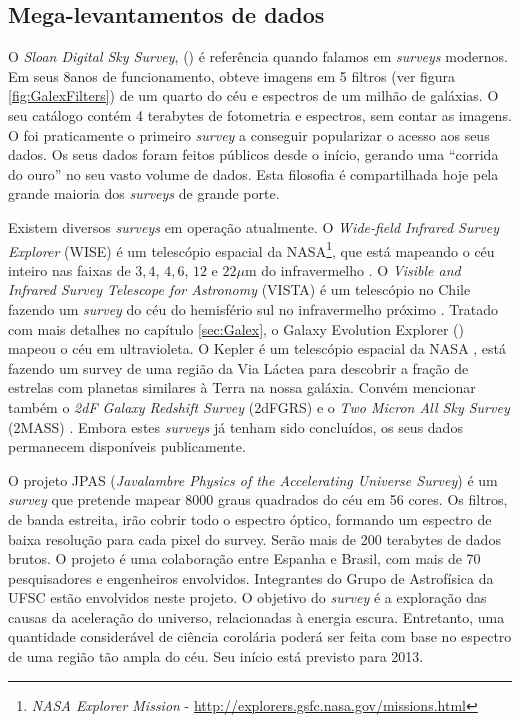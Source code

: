 \subsection{Mega-levantamentos de dados}

O {\em Sloan Digital Sky Survey}, (\SDSS) \citep{York2000} é referência quando
falamos em {\em surveys} modernos. Em seus 8\fixme anos de funcionamento, obteve
imagens em 5 filtros (ver figura \ref{fig:GalexFilters}) de um quarto do céu e
espectros de um milhão de galáxias. O seu catálogo contém 4 terabytes de
fotometria e espectros, sem contar as imagens. O \SDSS foi praticamente o
primeiro {\em survey} a conseguir popularizar o acesso aos seus dados. Os seus
dados foram feitos públicos desde o início\citneed, gerando uma ``corrida do
ouro'' no seu vasto volume de dados. Esta filosofia é compartilhada hoje pela
grande maioria dos {\em surveys} de grande porte.

Existem diversos {\em surveys} em operação atualmente. O {\em Wide-field
Infrared Survey Explorer} (WISE) é um telescópio espacial da NASA\footnote{{\em
NASA Explorer Mission} - \url{http://explorers.gsfc.nasa.gov/missions.html}},
que está mapeando o céu inteiro nas faixas de $3,4$, $4,6$, $12$ e $22\mu$m do
infravermelho \citep{Wright2010}. O {\em Visible and Infrared Survey Telescope
for Astronomy} (VISTA) é um telescópio no Chile fazendo um {\em survey} do céu
do hemisfério sul no infravermelho próximo \citep{Born2010}. Tratado com mais
detalhes no capítulo \ref{sec:Galex}, o {Galaxy Evolution Explorer} (\galex)
mapeou o céu em ultravioleta. O Kepler é um telescópio espacial da NASA
\citep{Borucki2010}, está fazendo um survey de uma região da Via Láctea para
descobrir a fração de estrelas com planetas similares à Terra na nossa galáxia.
Convém mencionar também o {\em 2dF Galaxy Redshift Survey} (2dFGRS)
\citep{Colless1999} e o {\em Two Micron All Sky Survey} (2MASS)
\citep{Skrutskie2006}. Embora estes {\em surveys} já tenham sido concluídos, os
seus dados permanecem disponíveis publicamente.

O projeto JPAS ({\em Javalambre Physics of the Accelerating Universe Survey}) é
um {\em survey} que pretende mapear $8000$ graus quadrados do céu em 56
cores\citep{Benitez2009}. Os filtros, de banda estreita, irão cobrir todo o
espectro óptico, formando um espectro de baixa resolução para cada pixel do
survey. Serão mais de 200 terabytes de dados brutos\citneed. O projeto é uma
colaboração entre Espanha e Brasil, com mais de 70 pesquisadores e engenheiros
envolvidos. Integrantes do Grupo de Astrofísica da UFSC estão envolvidos neste
projeto\citneed. O objetivo do {\em survey} é a exploração das causas da
aceleração do universo, relacionadas à energia escura. Entretanto, uma
quantidade considerável de ciência corolária poderá ser feita com base no
espectro de uma região tão ampla do céu. Seu início está previsto para 2013.

